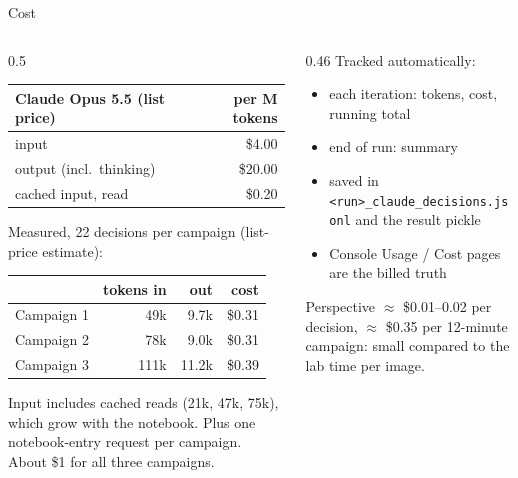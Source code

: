 \documentclass[aspectratio=169,10pt]{beamer}
\begin{document}
\begin{frame}{Cost}
  \begin{columns}[T]
    \begin{column}{0.5\textwidth}
      \small
      \begin{tabular}{lr}
        \toprule
        Claude Opus 5.5 (list price) & per M tokens \\
        \midrule
        input              & \$4.00 \\
        output (incl.\ thinking) & \$20.00 \\
        cached input, read & \$0.20 \\
        \bottomrule
      \end{tabular}

      \vspace{3mm}
      Measured, 22 decisions per campaign (list-price estimate):

      \vspace{1mm}
      \begin{tabular}{lrrr}
        \toprule
        & tokens in & out & cost \\
        \midrule
        Campaign 1 & 49k & 9.7k & \$0.31 \\
        Campaign 2 & 78k & 9.0k & \$0.31 \\
        Campaign 3 & 111k & 11.2k & \$0.39 \\
        \bottomrule
      \end{tabular}

      \vspace{1mm}
      {\scriptsize Input includes cached reads (21k, 47k, 75k), which grow with the
       notebook. Plus one notebook-entry request per campaign.
       About \$1 for all three campaigns.}
    \end{column}
    \begin{column}{0.46\textwidth}
      Tracked automatically:
      \begin{itemize}\small
        \item each iteration: tokens, cost, running total
        \item end of run: summary
        \item saved in \texttt{<run>\_claude\_decisions.jsonl} and the result pickle
        \item Console Usage / Cost pages are the billed truth
      \end{itemize}
      \vspace{2mm}
      \begin{block}{Perspective}
        \scriptsize
        $\approx$ \$0.01--0.02 per decision, $\approx$ \$0.35 per 12-minute campaign:
        small compared to the lab time per image.
      \end{block}
    \end{column}
  \end{columns}
\end{frame}
\end{document}
